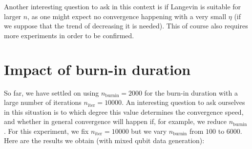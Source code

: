 \documentclass[12pt]{memoir}
\newcommand{\nitern}[1]{$n_{\text{iter}}=#1$}
\newcommand{\nburninn}[1]{$n_{\text{burnin}}=#1$}
\newcommand{\nburnin}[0]{$n_{\text{burnin}} $ }
\begin{document}
Another interesting question to ask in this context is if Langevin is suitable for larger $n$, as one might expect no convergence happening with a very small $\eta$ (if we suppose that the trend of decreasing it is needed). This of course also requires more experiments in order to be confirmed.

\section{Impact of burn-in duration}\label{section:comp-burnin}
So far, we have settled on using \nburninn{2000} for the burn-in duration with a large number of iterations \nitern{10000}. An interesting question to ask ourselves in this situation is to which degree this value determines the convergence speed, and whether in general convergence will happen if, for example, we reduce \nburnin. For this experiment, we fix \nitern{10000} but we vary \nburnin from $100$ to $6000$. Here are the results we obtain (with mixed qubit data generation):
\end{document}
